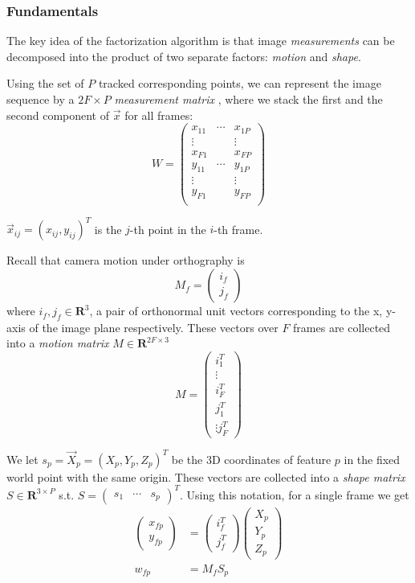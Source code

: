 \subsubsection{Fundamentals}
The key idea of the factorization algorithm is that image \emph{measurements}
can be decomposed into the product of two separate factors:
\emph{motion} and \emph{shape}. 

Using the set of $P$ tracked corresponding
points, we can represent the image sequence by a $2F\times P$ \emph{measurement matrix
}, where we stack the first and the second component of $\vec x$ for
all frames:$$W =
\begin{pmatrix}
  x_{11} & \cdots & x_{1P}\\
  \vdots &  & \vdots \\
  x_{F1} & & x_{FP}\\
  y_{11} & \cdots & y_{1P}\\
  \vdots &  & \vdots \\
  y_{F1} & & y_{FP}\\
\end{pmatrix}
$$

$\vec x_{ij} = (x_{ij}, y_{ij})^T$ is the $j$-th point in the
$i$-th frame. 

Recall that camera motion under orthography is $$M_f =
\begin{pmatrix}
  i_f\\
  j_f
\end{pmatrix}
$$ where $i_f, j_f \in \mathbf{R}^{3}$, a pair of orthonormal unit vectors
corresponding to the x, y-axis of the image plane respectively. These vectors over $F$ frames are collected into a
\emph{motion matrix} $M\in \mathbf{R}^{2F \times 3}$ $$M =
\begin{pmatrix}
  i_1^T\\ \vdots \\  i_F^T \\ j_1^T \\ \vdots j_F^T
\end{pmatrix}
$$

We let $s_p = \vec X_p = (X_p, Y_p, Z_p)^T$ be the 3D coordinates of feature $p$ in the fixed world point with the same origin. These vectors are collected into a
\emph{shape matrix} $S\in \mathbf{R}^{3 \times P}$ s.t. $S =
\begin{pmatrix}
  s_1 & \cdots & s_p
\end{pmatrix}^T$. Using this notation, for a single frame we get
\begin{align*}
  \begin{pmatrix}
    x_{fp}\\y_{fp}
  \end{pmatrix} &=
  \begin{pmatrix}
    i_{f}^T\\j_{f}^T
  \end{pmatrix}
  \begin{pmatrix}
    X_p\\ Y_p\\ Z_p
  \end{pmatrix}\\
w_{fp} &= M_fS_p  
\end{align*}


